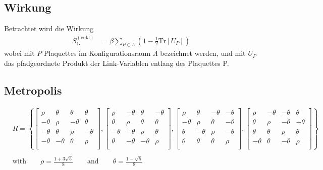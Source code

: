 

\subsection{Wirkung}

Betrachtet wird die Wirkung
\begin{align*}
 S_G^{(\textrm{eukl})} & = \beta \sum_{P \in \Lambda} \left(1-\frac{1}{2} \textrm{Tr} \left[ U_P \right] \right)
\end{align*}
wobei mit $P$ Plaquettes im Konfigurationsraum $\Lambda$ bezeichnet werden, und mit $U_P$ das pfadgeordnete Produkt der Link-Variablen entlang des Plaquettes P.

\subsection{Metropolis}


\begin{align*}
 &R = \left\{
 \begin{bmatrix}
  \rho    & \theta  & \theta  & \theta  \\
  -\theta & \rho    & -\theta & \theta  \\
  -\theta & \theta  & \rho    & -\theta \\
  -\theta & -\theta & \theta  & \rho    \\
 \end{bmatrix},
 \begin{bmatrix}
  \rho    & -\theta & \theta & -\theta \\
  \theta  & \rho    & \theta & \theta  \\
  -\theta & -\theta  & \rho   & \theta  \\
  \theta  & -\theta & -\theta & \rho    \\
 \end{bmatrix},
 \begin{bmatrix}
  \rho    & \theta & -\theta & -\theta \\
  -\theta  & \rho    & \theta & -\theta  \\
  \theta & -\theta  & \rho   & -\theta  \\
  \theta  & \theta & \theta & \rho    \\
 \end{bmatrix},
 \begin{bmatrix}
  \rho    & -\theta & -\theta & \theta \\
  \theta  & \rho    & -\theta & -\theta  \\
  \theta & \theta  & \rho   & \theta  \\
  -\theta  & \theta & -\theta & \rho    \\
 \end{bmatrix}
 \right\}\\\\
 &\textrm{with} \qquad \rho = \frac{1 + 3\sqrt{5}}{8} \qquad \textrm{and} \qquad \theta = \frac{1-\sqrt{5}}{8}
\end{align*}




